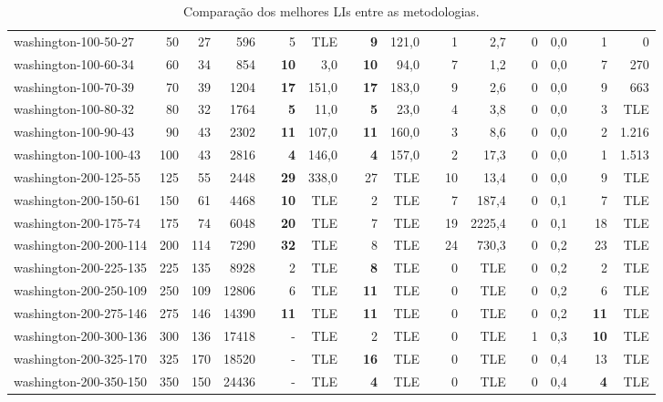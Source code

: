 \begin{table}[!ht]
{\begin{tabular}{lrrrlrrlrrlrrlrrlrr}
washington-100-50-27 & 50 & 27 & 596 &  & 5 & TLE &  & \textbf{9} & 121,0 &  & 1 & 2,7 &  & 0 & 0,0 &  & 1 & 0 \\
washington-100-60-34 & 60 & 34 & 854 &  & \textbf{10} & 3,0 &  & \textbf{10} & 94,0 &  & 7 & 1,2 &  & 0 & 0,0 &  & 7 & 270 \\
washington-100-70-39 & 70 & 39 & 1204 &  & \textbf{17} & 151,0 &  & \textbf{17} & 183,0 &  & 9 & 2,6 &  & 0 & 0,0 &  & 9 & 663 \\
washington-100-80-32 & 80 & 32 & 1764 &  & \textbf{5} & 11,0 &  & \textbf{5} & 23,0 &  & 4 & 3,8 &  & 0 & 0,0 &  & 3 & TLE \\
washington-100-90-43 & 90 & 43 & 2302 &  & \textbf{11} & 107,0 &  & \textbf{11} & 160,0 &  & 3 & 8,6 &  & 0 & 0,0 &  & 2 & 1.216 \\
washington-100-100-43 & 100 & 43 & 2816 &  & \textbf{4} & 146,0 &  & \textbf{4} & 157,0 &  & 2 & 17,3 &  & 0 & 0,0 &  & 1 & 1.513 \\ \hline
washington-200-125-55 & 125 & 55 & 2448 &  & \textbf{29} & 338,0 &  & 27 & TLE &  & 10 & 13,4 &  & 0 & 0,0 &  & 9 & TLE \\
washington-200-150-61 & 150 & 61 & 4468 &  & \textbf{10} & TLE &  & 2 & TLE &  & 7 & 187,4 &  & 0 & 0,1 &  & 7 & TLE \\
washington-200-175-74 & 175 & 74 & 6048 &  & \textbf{20} & TLE &  & 7 & TLE &  & 19 & 2225,4 &  & 0 & 0,1 &  & 18 & TLE \\
washington-200-200-114 & 200 & 114 & 7290 &  & \textbf{32} & TLE &  & 8 & TLE &  & 24 & 730,3 &  & 0 & 0,2 &  & 23 & TLE \\
washington-200-225-135 & 225 & 135 & 8928 &  & 2 & TLE &  & \textbf{8} & TLE &  & 0 & TLE &  & 0 & 0,2 &  & 2 & TLE \\
washington-200-250-109 & 250 & 109 & 12806 &  & 6 & TLE &  & \textbf{11} & TLE &  & 0 & TLE &  & 0 & 0,2 &  & 6 & TLE \\
washington-200-275-146 & 275 & 146 & 14390 &  & \textbf{11} & TLE &  & \textbf{11} & TLE &  & 0 & TLE &  & 0 & 0,2 &  & \textbf{11} & TLE \\
washington-200-300-136 & 300 & 136 & 17418 &  & - & TLE &  & 2 & TLE &  & 0 & TLE &  & 1 & 0,3 &  & \textbf{10} & TLE \\
washington-200-325-170 & 325 & 170 & 18520 &  & - & TLE &  & \textbf{16} & TLE &  & 0 & TLE &  & 0 & 0,4 &  & 13 & TLE \\
washington-200-350-150 & 350 & 150 & 24436 &  & - & TLE &  & \textbf{4} & TLE &  & 0 & TLE &  & 0 & 0,4 &  & \textbf{4} & TLE \\ \hline
\end{tabular}%
}
\caption{Comparação dos melhores LIs entre as metodologias.}
\label{tab:lis-all-comp}
\end{table}

